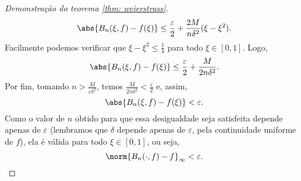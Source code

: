 \begin{proof}[Demonstração do teorema \ref{thm: weierstrass}]
\[        \abs{ B_{ n } (\xi, f) - f(\xi) } \leq
        \frac{ \varepsilon }{ 2 } 
        + \frac{ 2M }{ n \delta^2 } ( \xi - \xi^2 )
    .\]
    Facilmente podemos verificar que \( \xi - \xi^2 \leq \frac{ 1 }{ 4 } \) para todo \( \xi \in [0, 1] \).
    Logo, \[
        \abs{ B_{ n } (\xi, f) - f(\xi) } \leq
        \frac{ \varepsilon }{ 2 } 
        + \frac{ M }{ 2 n \delta^2 }
    .\]
    Por fim, tomando \( n > \frac{ M }{ \varepsilon \delta^2 } \), temos \( \frac{ M }{ 2 n \delta^2 } < \frac{ \varepsilon }{ 2 } \) e, assim, \[
        \abs{ B_{ n } (\xi, f) - f(\xi) } < \varepsilon
    .\]
    Como o valor de \( n \) obtido para que essa desigualdade seja satisfeita depende apenas de \( \varepsilon \) (lembramos que \( \delta \) depende apenas de \( \varepsilon \), pela continuidade uniforme de \( f \)), ela é válida para todo \( \xi \in [0, 1] \), ou seja, \[
        \norm{ B_{ n } (\cdot , f) - f }_{ \infty } < \varepsilon
    .\qedhere\]
 \end{proof}
 

